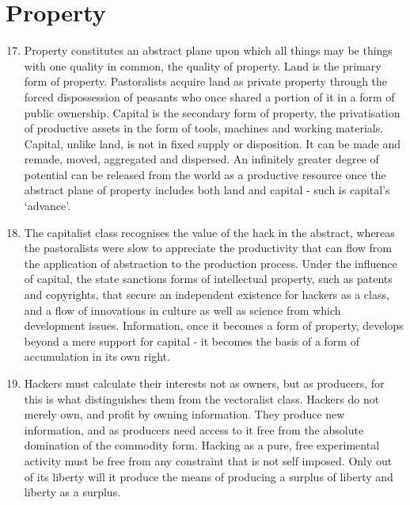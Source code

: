 \documentclass[letterpaper,12pt,english]{sphinxmanual}
\begin{document}
\section{Property}
\label{wark:property}\begin{enumerate}
\setcounter{enumi}{16}
\item {} 
Property constitutes an abstract plane upon which all things may be things with one quality in common, the quality of property. Land is the primary form of property. Pastoralists acquire land as private property through the forced dispossession of peasants who once shared a portion of it in a form of public ownership. Capital is the secondary form of property, the privatisation of productive assets in the form of tools, machines and working materials. Capital, unlike land, is not in fixed supply or disposition. It can be made and remade, moved, aggregated and dispersed. An infinitely greater degree of potential can be released from the world as a productive resource once the abstract plane of property includes both land and capital - such is capital's `advance'.

\item {} 
The capitalist class recognises the value of the hack in the abstract, whereas the pastoralists were slow to appreciate the productivity that can flow from the application of abstraction to the production process. Under the influence of capital, the state sanctions forms of intellectual property, such as patents and copyrights, that secure an independent existence for hackers as a class, and a flow of innovations in culture as well as science from which development issues. Information, once it becomes a form of property, develops beyond a mere support for capital - it becomes the basis of a form of accumulation in its own right.

\item {} 
Hackers must calculate their interests not as owners, but as producers, for this is what distinguishes them from the vectoralist class. Hackers do not merely own, and profit by owning information. They produce new information, and as producers need access to it free from the absolute domination of the commodity form. Hacking as a pure, free experimental activity must be free from any constraint that is not self imposed. Only out of its liberty will it produce the means of producing a surplus of liberty and liberty as a surplus.


\end{enumerate}
\end{document}
